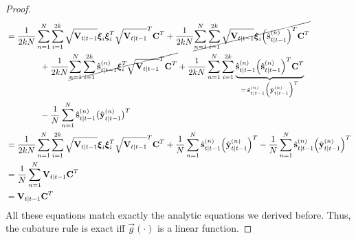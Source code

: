 \begin{proof}
\begin{align*}
					&= \frac{1}{2kN} \sum_{n = 1}^{N} \sum_{i = 1}^{2k} \sqrt{\boldsymbol{\mathrm{V}}_{t \vert t - 1}} \boldsymbol{\mathrm{\xi}}_i \boldsymbol{\mathrm{\xi}}_i^T \sqrt{\boldsymbol{\mathrm{V}}_{t \vert t - 1}}^T \boldsymbol{\mathrm{C}}^T + \frac{1}{2kN} \cancel{\sum_{n = 1}^{N} \sum_{i = 1}^{2k} \sqrt{\boldsymbol{\mathrm{V}}_{t \vert t - 1}} \boldsymbol{\mathrm{\xi}}_i \Big(\hat{\boldsymbol{\mathrm{s}}}_{t \vert t - 1}^{(n)}\Big)^T \boldsymbol{\mathrm{C}}^T} \\
						&\qquad\qquad + \frac{1}{2kN} \cancel{\sum_{n = 1}^{N} \sum_{i = 1}^{2k} \hat{\boldsymbol{\mathrm{s}}}_{t \vert t - 1}^{(n)} \boldsymbol{\mathrm{\xi}}_i^T \sqrt{\boldsymbol{\mathrm{V}}_{t \vert t - 1}}^T \boldsymbol{\mathrm{C}}^T} + \frac{1}{2kN} \sum_{n = 1}^{N} \sum_{i = 1}^{2k} \underbrace{\hat{\boldsymbol{\mathrm{s}}}_{t \vert t - 1}^{(n)} \Big(\hat{\boldsymbol{\mathrm{s}}}_{t \vert t - 1}^{(n)}\Big)^T \boldsymbol{\mathrm{C}}^T}_{=\, \hat{\boldsymbol{\mathrm{s}}}_{t \vert t - 1}^{(n)} \Big( \hat{\boldsymbol{\mathrm{y}}}_{t \vert t - 1}^{(n)} \Big)^T} \\
						&\qquad\qquad - \frac{1}{N} \sum_{n = 1}^{N} \hat{\boldsymbol{\mathrm{s}}}_{t \vert t - 1}^{(n)} \big( \hat{\boldsymbol{\mathrm{y}}}_{t \vert t - 1}^{(n)} \big)^T \\
					&= \frac{1}{2kN} \sum_{n = 1}^{N} \sum_{i = 1}^{2k} \sqrt{\boldsymbol{\mathrm{V}}_{t \vert t - 1}} \boldsymbol{\mathrm{\xi}}_i \boldsymbol{\mathrm{\xi}}_i^T \sqrt{\boldsymbol{\mathrm{V}}_{t \vert t - 1}}^T \boldsymbol{\mathrm{C}}^T + \frac{1}{N} \sum_{n = 1}^{N} \hat{\boldsymbol{\mathrm{s}}}_{t \vert t - 1}^{(n)} \Big( \hat{\boldsymbol{\mathrm{y}}}_{t \vert t - 1}^{(n)} \Big)^T - \frac{1}{N} \sum_{n = 1}^{N} \hat{\boldsymbol{\mathrm{s}}}_{t \vert t - 1}^{(n)} \Big( \hat{\boldsymbol{\mathrm{y}}}_{t \vert t - 1}^{(n)} \Big)^T \\
					&= \frac{1}{N} \sum_{n = 1}^{N} \boldsymbol{\mathrm{V}}_{t \vert t - 1} \boldsymbol{\mathrm{C}}^T \\
					&= \boldsymbol{\mathrm{V}}_{t \vert t - 1} \boldsymbol{\mathrm{C}}^T
			\end{align*}
			All these equations match exactly the analytic equations we derived before. Thus, the cubature rule is exact iff \(\vec{g}(\cdot)\) is a linear function.
		\end{proof}

